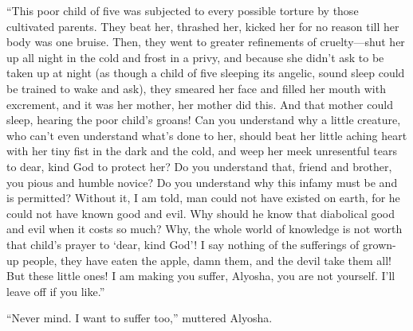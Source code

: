 ``This poor child of five was subjected to every possible torture by
those cultivated parents. They beat her, thrashed her, kicked her for
no reason till her body was one bruise. Then, they went to greater
refinements of cru\-el\-ty---shut her up all night in the cold and
frost in a privy, and because she didn't ask to be taken up at night
(as though a child of five sleeping its angelic, sound sleep could be
trained to wake and ask), they smeared her face and filled her mouth
with excrement, and it was her mother, her mother did this. And that
mother could sleep, hearing the poor child's groans! Can you
understand why a little creature, who can't even understand what's
done to her, should beat her little aching heart with her tiny fist in
the dark and the cold, and weep her meek unresentful tears to dear,
kind God to protect her? Do you understand that, friend and brother,
you pious and humble novice? Do you understand why this infamy must be
and is permitted? Without it, I am told, man could not have existed on
earth, for he could not have known good and evil. Why should he know
that diabolical good and evil when it costs so much? Why, the whole
world of knowledge is not worth that child's prayer to `dear, kind
God'! I say nothing of the sufferings  of grown-up people,
they have eaten the apple, damn them, and the devil take them all! But
these little ones! I am making you suffer, Alyosha, you are not
yourself. I'll leave off if you like.''

``Never mind. I want to suffer too,'' muttered Alyosha.

